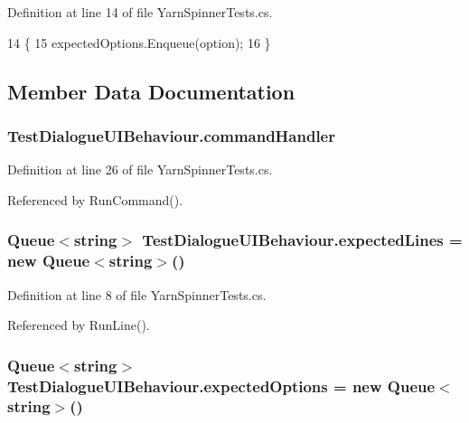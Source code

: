 Definition at line 14 of file Yarn\-Spinner\-Tests.\-cs.


\begin{DoxyCode}
14                                             \{
15         expectedOptions.Enqueue(option);
16     \}
\end{DoxyCode}


\subsection{Member Data Documentation}
\hypertarget{a00171_a5c2003ece8aeab171db3a749bef5f770}{
\subsubsection[{command\-Handler}]{ Test\-Dialogue\-U\-I\-Behaviour.\-command\-Handler}}\label{a00171_a5c2003ece8aeab171db3a749bef5f770}


Definition at line 26 of file Yarn\-Spinner\-Tests.\-cs.



Referenced by Run\-Command().

\hypertarget{a00171_ab0f7b55e776ae494a651c845b496916c}{
\subsubsection[{expected\-Lines}]{\setlength{\rightskip}{0pt plus 5cm}Queue$<$string$>$ Test\-Dialogue\-U\-I\-Behaviour.\-expected\-Lines = new Queue$<$string$>$()\hspace{0.3cm}{\ttfamily [private]}}}\label{a00171_ab0f7b55e776ae494a651c845b496916c}


Definition at line 8 of file Yarn\-Spinner\-Tests.\-cs.



Referenced by Run\-Line().

\hypertarget{a00171_a94e4308d412945c977b2deb63f139009}{
\subsubsection[{expected\-Options}]{\setlength{\rightskip}{0pt plus 5cm}Queue$<$string$>$ Test\-Dialogue\-U\-I\-Behaviour.\-expected\-Options = new Queue$<$string$>$()\hspace{0.3cm}{\ttfamily [private]}}}\label{a00171_a94e4308d412945c977b2deb63f139009}


